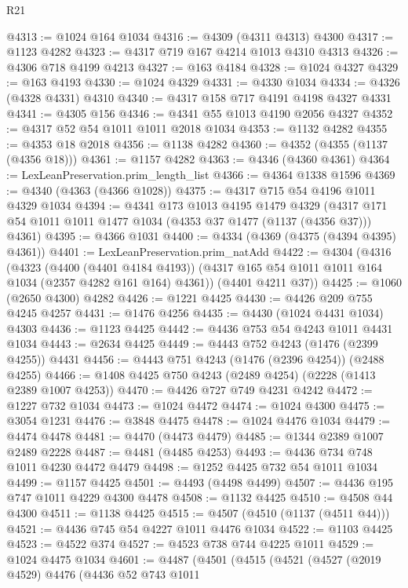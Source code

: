\begin{lexlean}{R21}
\begin{coremodule}
@4313 := @1024 @164 @1034
@4316 := @4309 (@4311 @4313) @4300
@4317 := @1123 @4282
@4323 := @4317 @719 @167 @4214 @1013 @4310 @4313
@4326 := @4306 @718 @4199 @4213
@4327 := @163 @4184
@4328 := @1024 @4327
@4329 := @163 @4193
@4330 := @1024 @4329
@4331 := @4330 @1034
@4334 := @4326 (@4328 @4331) @4310
@4340 := @4317 @158 @717 @4191 @4198 @4327 @4331
@4341 := @4305 @156
@4346 := @4341 @55 @1013 @4190 @2056 @4327
@4352 := @4317 @52 @54 @1011 @1011 @2018 @1034
@4353 := @1132 @4282
@4355 := @4353 @18 @2018
@4356 := @1138 @4282
@4360 := @4352 (@4355 (@1137 (@4356 @18)))
@4361 := @1157 @4282
@4363 := @4346 (@4360 @4361)
@4364 := LexLeanPreservation.prim_length_list
@4366 := @4364 @1338 @1596
@4369 := @4340 (@4363 (@4366 @1028))
@4375 := @4317 @715 @54 @4196 @1011 @4329 @1034
@4394 := @4341
    @173
    @1013
    @4195
    @1479
    @4329
    (@4317 @171 @54 @1011 @1011 @1477 @1034 (@4353 @37 @1477 (@1137 (@4356 @37))) @4361)
@4395 := @4366 @1031
@4400 := @4334 (@4369 (@4375 (@4394 @4395) @4361))
@4401 := LexLeanPreservation.prim_natAdd
@4422 := @4304
    (@4316
      (@4323
        (@4400 (@4401 @4184 @4193))
        (@4317 @165 @54 @1011 @1011 @164 @1034 (@2357 @4282 @161 @164) @4361))
      (@4401 @4211 @37))
@4425 := @1060 (@2650 @4300) @4282
@4426 := @1221 @4425
@4430 := @4426 @209 @755 @4245 @4257
@4431 := @1476 @4256
@4435 := @4430 (@1024 @4431 @1034) @4303
@4436 := @1123 @4425
@4442 := @4436 @753 @54 @4243 @1011 @4431 @1034
@4443 := @2634 @4425
@4449 := @4443 @752 @4243 (@1476 (@2399 @4255)) @4431
@4456 := @4443 @751 @4243 (@1476 (@2396 @4254)) (@2488 @4255)
@4466 := @1408 @4425 @750 @4243 (@2489 @4254) (@2228 (@1413 @2389 @1007 @4253))
@4470 := @4426 @727 @749 @4231 @4242
@4472 := @1227 @732 @1034
@4473 := @1024 @4472
@4474 := @1024 @4300
@4475 := @3054 @1231
@4476 := @3848 @4475
@4478 := @1024 @4476 @1034
@4479 := @4474 @4478
@4481 := @4470 (@4473 @4479)
@4485 := @1344 @2389 @1007 @2489 @2228
@4487 := @4481 (@4485 @4253)
@4493 := @4436 @734 @748 @1011 @4230 @4472 @4479
@4498 := @1252 @4425 @732 @54 @1011 @1034
@4499 := @1157 @4425
@4501 := @4493 (@4498 @4499)
@4507 := @4436 @195 @747 @1011 @4229 @4300 @4478
@4508 := @1132 @4425
@4510 := @4508 @44 @4300
@4511 := @1138 @4425
@4515 := @4507 (@4510 (@1137 (@4511 @44)))
@4521 := @4436 @745 @54 @4227 @1011 @4476 @1034
@4522 := @1103 @4425
@4523 := @4522 @374
@4527 := @4523 @738 @744 @4225 @1011
@4529 := @1024 @4475 @1034
@4601 := @4487
    (@4501
      (@4515
        (@4521
          (@4527
            (@2019 @4529)
            @4476
            (@4436
              @52
              @743
              @1011

\end{coremodule}
\end{lexlean}
